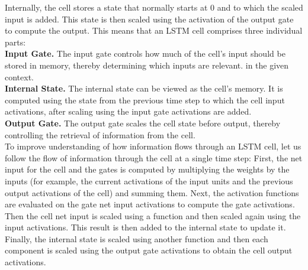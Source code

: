 \documentclass[twoside,a4paper,10pt,DIV=12,BCOR=12mm]{scrartcl}
\begin{document}
Internally, the cell stores a state that normally starts at \begin{math}0\end{math} and to which the scaled input is added. This state is then scaled using the activation of the output gate to compute the output.
This means that an LSTM cell comprises three individual parts:\\
\textbf{Input Gate.} The input gate controls how much of the cell's input should be stored in memory, thereby determining which inputs are relevant. in the given context.\\
\textbf{Internal State.} The internal state can be viewed as the cell's memory. It is computed using the state from the previous time step to which the cell input activations, after scaling using the input gate activations are added.\\
\textbf{Output Gate.} The output gate scales the cell state before output, thereby controlling the retrieval of information from the cell.\cite{hochreiter1997lstm} \\
To improve understanding of how information flows through an LSTM cell, let us follow the flow of information through the cell at a single time step:
First, the net input for the cell and the gates is computed by multiplying the weights by the inputs (for example, the current activations of the input units and the previous output activations of the cell) and summing them. Next, the activation functions are evaluated on the gate net input activations to compute the gate activations. Then the cell net input is scaled using a function and then scaled again using the input activations. This result is then added to the internal state to update it. Finally,  the internal state is scaled using another function and then each component is scaled using the output gate activations to obtain the cell output activations.\cite{hochreiter1997lstm}
\end{document}
